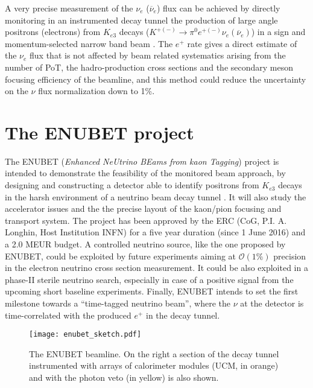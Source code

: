 \documentclass[12pt]{article}
\begin{document}
A very precise measurement of the $\nu_e$ ($\overline{\nu}_e$) flux can be achieved by directly monitoring in an instrumented
decay tunnel the production of large angle positrons (electrons) from 
$K_{e3}$ decays ($K^{+(-)} \rightarrow \pi^0 e^{+(-)} \nu_e (\overline{\nu}_e)$)
in a sign and momentum-selected narrow band beam \cite{proposal}. The $e^{+}$ rate gives a direct estimate of the $\nu_e$ flux
that is not affected by beam related systematics arising from the number of PoT, the hadro-production cross sections and the
secondary meson focusing efficiency of the beamline, and this method could reduce the uncertainty on the $\nu$ flux normalization
down to 1\%.
%



\section{The ENUBET project}

The ENUBET (\textit{Enhanced NeUtrino BEams from kaon Tagging}) project is intended to demonstrate the feasibility of the 
monitored beam approach, by designing and constructing
a detector able to identify positrons from $K_{e3}$ decays in the harsh environment of a neutrino beam decay tunnel \cite{EoI}. 
It will also study the accelerator issues and the the precise layout of the kaon/pion focusing and transport system.
The project has been approved by the ERC (CoG, P.I. A. Longhin, Host Institution INFN) for a five year duration (since 1 June 2016) and
a 2.0 MEUR budget. A controlled neutrino source, like the one proposed by ENUBET, could be exploited by future experiments aiming at
$\mathcal{O}(1\%)$ precision in the electron neutrino cross section measurement. It could be also exploited
in a phase-II sterile neutrino search, especially in case of a positive signal from the upcoming short baseline experiments. 
Finally, ENUBET intends to set the first milestone towards a ``time-tagged neutrino beam'', where the $\nu$
at the detector is time-correlated with the produced $e^{+}$ in the decay tunnel.

\begin{figure}[htb]
\centering
\texttt{[image: enubet\_sketch.pdf]}
\caption{The ENUBET beamline. On the right a section of the decay tunnel instrumented with arrays of calorimeter modules
(UCM, in orange) and with the photon veto (in yellow) is also shown.}
\label{fig:enubet}
\end{figure}
\end{document}
